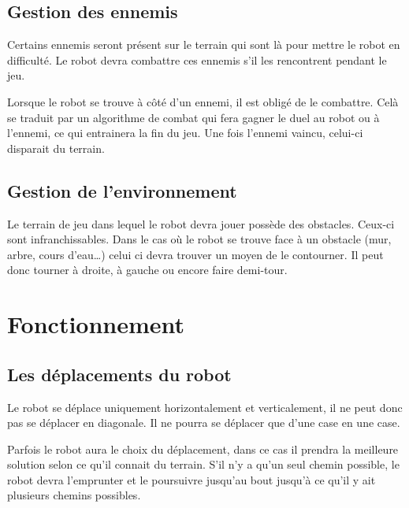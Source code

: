 \documentclass[a4paper 12pts]{article}
\begin{document}
\subsection{Gestion des ennemis}
Certains ennemis seront présent sur le terrain qui sont là pour mettre le robot en difficulté. Le robot devra combattre ces ennemis s'il les rencontrent pendant le jeu.

Lorsque le robot se trouve à côté d'un ennemi, il est obligé de le combattre. Celà se traduit par un algorithme de combat qui fera gagner le duel au robot ou à l'ennemi, ce qui entrainera la fin du jeu. Une fois l'ennemi vaincu, celui-ci disparait du terrain.

\subsection{Gestion de l'environnement}
Le terrain de jeu dans lequel le robot devra jouer possède des obstacles. Ceux-ci sont infranchissables. Dans le cas où le robot se trouve face à un obstacle (mur, arbre, cours d'eau\ldots) celui ci devra trouver un moyen de le contourner. Il peut donc tourner à droite, à gauche ou encore faire demi-tour.


\section{Fonctionnement}

\subsection{Les déplacements du robot}
Le robot se déplace uniquement horizontalement et verticalement, il ne peut donc pas se déplacer en diagonale. Il ne pourra se déplacer que d'une case en une case.

Parfois le robot aura le choix du déplacement, dans ce cas il prendra la meilleure solution selon ce qu'il connait du terrain. S'il n'y a qu'un seul chemin possible, le robot devra l'emprunter et le poursuivre jusqu'au bout jusqu'à ce qu'il y ait plusieurs chemins possibles.
\end{document}
